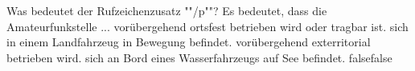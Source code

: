     {Was bedeutet der Rufzeichenzusatz ""/p""? Es bedeutet, dass die Amateurfunkstelle ...}
    {vorübergehend ortsfest betrieben wird oder tragbar ist.}
    {sich in einem Landfahrzeug in Bewegung befindet.}
    {vorübergehend exterritorial betrieben wird.}
    {sich an Bord eines Wasserfahrzeugs auf See befindet.}
    {false}{false}